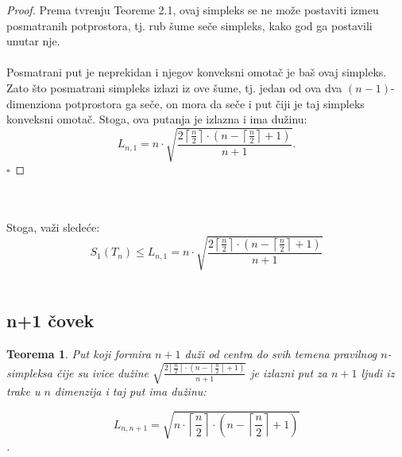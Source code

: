 \documentclass[11pt,letter]{article}
\newtheorem{teo}{\bf Teorema}[section]
\newcommand{\qed}{\hfill $\square$ \bigskip}
\begin{document}
\begin{proof}
Prema tvr\dj enju Teoreme 2.1, ovaj simpleks se ne mo\v ze postaviti izme\dj u posmatranih potprostora, tj. rub \v sume se\v ce simpleks, kako god ga postavili unutar nje.
\\
\\
\indent Posmatrani put je neprekidan i njegov konveksni omota\v c je ba\v s ovaj simpleks. Zato \v sto posmatrani simpleks izlazi iz ove \v sume, tj. jedan od ova dva $(n-1)$-dimenziona potprostora ga se\v ce, on mora da se\v ce i put \v ciji je taj simpleks konveksni omota\v c. Stoga, ova putanja je izlazna i ima du\v zinu:
\\
$$L_{n,1}=n\cdot \sqrt{\frac{2\left\lceil \frac{n}{2}\right\rceil\cdot \left( n-\left\lceil\frac{n}{2}\right\rceil+1\right)}{n+1}}. $$ \qed
\end{proof}
\\
\\
\indent Stoga, va\v zi slede\' ce:
$$S_1(T_n)\leqslant L_{n, 1}=n\cdot \sqrt{\frac{2\left\lceil \frac{n}{2}\right\rceil\cdot \left( n-\left\lceil\frac{n}{2}\right\rceil+1\right)}{n+1}}$$
\\
\subsection[n+1 \v covek]{n+1 \v covek} 
\bigskip
\begin{teo} Put koji formira $n+1$ du\v zi od centra do svih temena pravilnog $n$-simpleksa  \v cije su ivice du\v zine $\sqrt{\frac{2\left\lceil \frac{n}{2}\right\rceil\cdot \left( n-\left\lceil\frac{n}{2}\right\rceil+1\right)}{n+1}}$ je izlazni put za $n+1$ ljudi iz trake u $n$ dimenzija i taj put ima du\v zinu:

$$L_{n,n+1}=\sqrt{n\cdot\left\lceil\frac{n}{2}\right\rceil\cdot\left( n-\left\lceil\frac{n}{2}\right\rceil+1\right)}$$.\end{teo}
\end{document}
